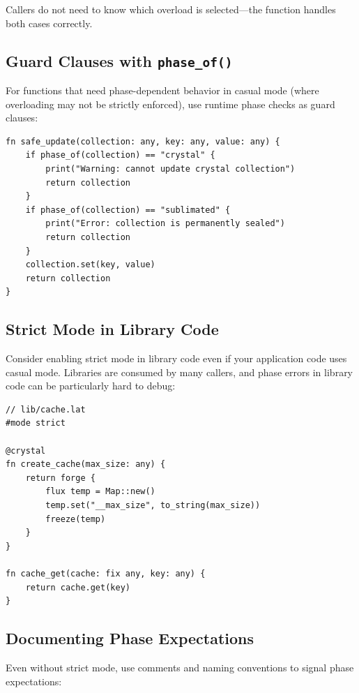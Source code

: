 Callers do not need to know which overload is selected---the function handles both cases correctly.

\subsection{Guard Clauses with \texttt{phase\_of()}}

For functions that need phase-dependent behavior in casual mode (where overloading may not be strictly enforced), use runtime phase checks as guard clauses:

\begin{lstlisting}[language=Lattice, caption={Runtime phase guards}]
fn safe_update(collection: any, key: any, value: any) {
    if phase_of(collection) == "crystal" {
        print("Warning: cannot update crystal collection")
        return collection
    }
    if phase_of(collection) == "sublimated" {
        print("Error: collection is permanently sealed")
        return collection
    }
    collection.set(key, value)
    return collection
}
\end{lstlisting}

\subsection{Strict Mode in Library Code}

Consider enabling strict mode in library code even if your application code uses casual mode.
Libraries are consumed by many callers, and phase errors in library code can be particularly hard to debug:

\begin{lstlisting}[language=Lattice, caption={Strict mode for library safety}]
// lib/cache.lat
#mode strict

@crystal
fn create_cache(max_size: any) {
    return forge {
        flux temp = Map::new()
        temp.set("__max_size", to_string(max_size))
        freeze(temp)
    }
}

fn cache_get(cache: fix any, key: any) {
    return cache.get(key)
}
\end{lstlisting}

\subsection{Documenting Phase Expectations}

Even without strict mode, use comments and naming conventions to signal phase expectations:

